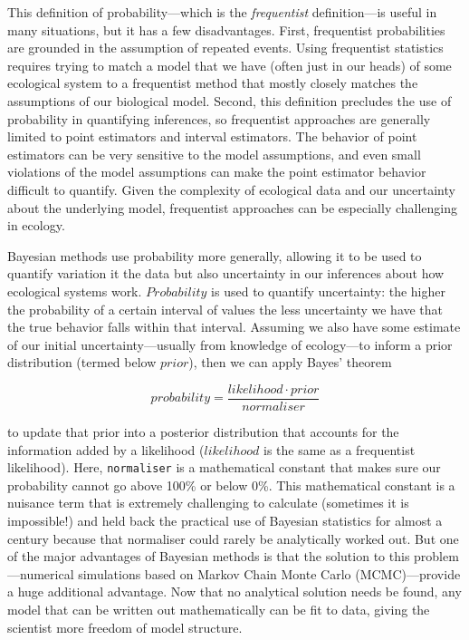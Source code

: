 \documentclass[11pt]{article}
\begin{document}
This definition of probability---which is the \emph{frequentist} definition---is useful in many situations, but it has a few disadvantages. First, frequentist probabilities are grounded in the assumption of repeated events. Using frequentist statistics requires trying to match a model that we have (often just in our heads) of some ecological system to a frequentist method that mostly closely matches the assumptions of our biological model. Second, this definition precludes the use of probability in quantifying inferences, so frequentist approaches are generally limited to point estimators and interval estimators.  The behavior of point estimators can be very sensitive to the model assumptions, and even small violations of the model assumptions can make the point estimator behavior difficult to quantify. Given the complexity of ecological data and our uncertainty about the underlying model, frequentist approaches can be especially challenging in ecology. 

Bayesian methods use probability more generally, allowing it to be used to quantify variation it the data but also uncertainty in our inferences about how ecological systems work. $Probability$ is used to quantify uncertainty: the higher the probability of a certain interval of values the less uncertainty we have that the true behavior falls within that interval. Assuming we also have some estimate of our initial uncertainty---usually from knowledge of ecology---to inform a prior distribution (termed below $prior$), then we can apply Bayes' theorem

\begin{equation}
  probability = \frac{likelihood \cdot prior}{normaliser}
  \label{bayes_theorem}
\end{equation}

to update that prior into a posterior distribution that accounts for the information added by a likelihood ($likelihood$ is the same as a frequentist likelihood). Here, \texttt{normaliser} is a mathematical constant that makes sure our probability cannot go above 100\% or below 0\%. This mathematical constant is a nuisance term that is extremely challenging to calculate (sometimes it is impossible!) and held back the practical use of Bayesian statistics for almost a century because that normaliser could rarely be analytically worked out. But one of the major advantages of Bayesian methods is that the solution to this problem---numerical simulations based on Markov Chain Monte Carlo (MCMC)---provide a huge additional advantage. Now that no analytical solution needs be found, any model that can be written out mathematically can be fit to data, giving the scientist more freedom of model structure.
\end{document}
